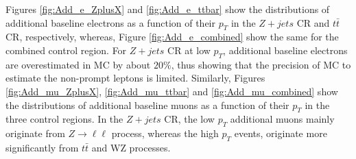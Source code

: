 Figures \ref{fig:Add_e_ZplusX} and \ref{fig:Add_e_ttbar} show the distributions of additional baseline electrons as a function of their $p_{T}$ in the $Z+jets$ CR and $t\bar{t}$ CR, respectively, whereas, Figure \ref{fig:Add_e_combined} show the same for the combined control region. For $Z+jets$ CR at low $p_{T}$, additional baseline electrons are overestimated in MC by about $20\%$, thus showing that the precision of MC to estimate the non-prompt leptons is limited. Similarly, Figures \ref{fig:Add_mu_ZplusX}, \ref{fig:Add_mu_ttbar} and \ref{fig:Add_mu_combined} show the distributions of additional baseline muons as a function of their $p_{T}$ in the three control regions. In the $Z+jets$ CR, the low $p_{T}$ additional muons mainly originate from $Z\rightarrow \ell \ell$ process, whereas the high $p_{T}$ events, originate more significantly from $t\bar{t}$ and WZ processes.


